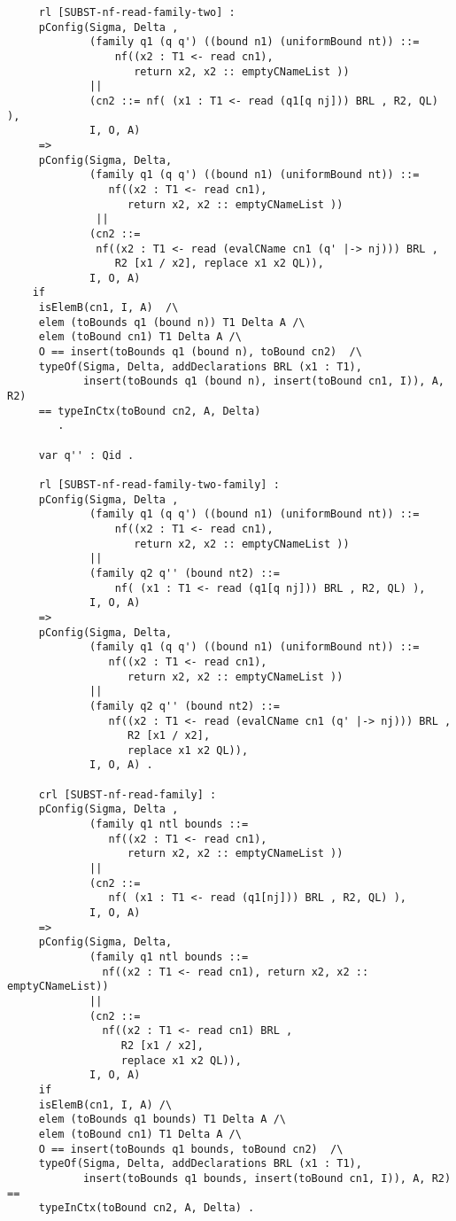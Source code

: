 \begin{lstlisting}
     rl [SUBST-nf-read-family-two] : 
     pConfig(Sigma, Delta ,
             (family q1 (q q') ((bound n1) (uniformBound nt)) ::= 
                 nf((x2 : T1 <- read cn1), 
                    return x2, x2 :: emptyCNameList )) 
             || 
             (cn2 ::= nf( (x1 : T1 <- read (q1[q nj])) BRL , R2, QL) ),
             I, O, A)  
     => 
     pConfig(Sigma, Delta,
             (family q1 (q q') ((bound n1) (uniformBound nt)) ::= 
                nf((x2 : T1 <- read cn1), 
                   return x2, x2 :: emptyCNameList ))  
              || 
             (cn2 ::= 
              nf((x2 : T1 <- read (evalCName cn1 (q' |-> nj))) BRL , 
                 R2 [x1 / x2], replace x1 x2 QL)),
             I, O, A) 
    if
     isElemB(cn1, I, A)  /\
     elem (toBounds q1 (bound n)) T1 Delta A /\
     elem (toBound cn1) T1 Delta A /\
     O == insert(toBounds q1 (bound n), toBound cn2)  /\
     typeOf(Sigma, Delta, addDeclarations BRL (x1 : T1), 
            insert(toBounds q1 (bound n), insert(toBound cn1, I)), A, R2)
     == typeInCtx(toBound cn2, A, Delta) 
        . 
     
     var q'' : Qid .
     
     rl [SUBST-nf-read-family-two-family] : 
     pConfig(Sigma, Delta ,
             (family q1 (q q') ((bound n1) (uniformBound nt)) ::= 
                 nf((x2 : T1 <- read cn1), 
                    return x2, x2 :: emptyCNameList )) 
             || 
             (family q2 q'' (bound nt2) ::= 
                 nf( (x1 : T1 <- read (q1[q nj])) BRL , R2, QL) ),
             I, O, A)  
     => 
     pConfig(Sigma, Delta,
             (family q1 (q q') ((bound n1) (uniformBound nt)) ::= 
                nf((x2 : T1 <- read cn1), 
                   return x2, x2 :: emptyCNameList ))  
             || 
             (family q2 q'' (bound nt2) ::= 
                nf((x2 : T1 <- read (evalCName cn1 (q' |-> nj))) BRL ,
                   R2 [x1 / x2], 
                   replace x1 x2 QL)),
             I, O, A) . 
      
     crl [SUBST-nf-read-family] : 
     pConfig(Sigma, Delta ,
             (family q1 ntl bounds ::= 
                nf((x2 : T1 <- read cn1), 
                   return x2, x2 :: emptyCNameList )) 
             || 
             (cn2 ::= 
                nf( (x1 : T1 <- read (q1[nj])) BRL , R2, QL) ),
             I, O, A)  
     => 
     pConfig(Sigma, Delta,
             (family q1 ntl bounds ::= 
               nf((x2 : T1 <- read cn1), return x2, x2 :: emptyCNameList))
             || 
             (cn2 ::= 
               nf((x2 : T1 <- read cn1) BRL , 
                  R2 [x1 / x2], 
                  replace x1 x2 QL)),
             I, O, A) 
     if 
     isElemB(cn1, I, A) /\
     elem (toBounds q1 bounds) T1 Delta A /\
     elem (toBound cn1) T1 Delta A /\
     O == insert(toBounds q1 bounds, toBound cn2)  /\
     typeOf(Sigma, Delta, addDeclarations BRL (x1 : T1), 
            insert(toBounds q1 bounds, insert(toBound cn1, I)), A, R2) ==
     typeInCtx(toBound cn2, A, Delta) .


\end{lstlisting}
